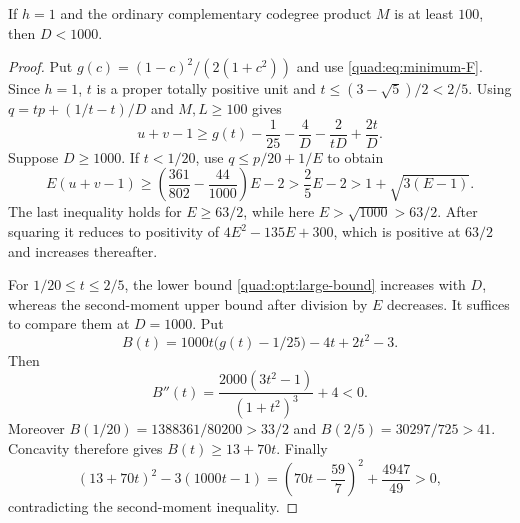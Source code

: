 \begin{lemma}\label{quad:opt:large-product}
If $h=1$ and the ordinary complementary codegree product $M$ is at
least $100$, then $D<1000$.
\end{lemma}
\begin{proof}
Put $g(c)=(1-c)^2/(2(1+c^2))$ and use
\eqref{quad:eq:minimum-F}. Since $h=1$, $t$ is a proper totally positive
unit and $t\le(3-\sqrt5)/2<2/5$. Using
$q=tp+(1/t-t)/D$ and $M,L\ge100$ gives
\begin{equation}\label{quad:opt:large-bound}
 u+v-1\ge g(t)-\frac1{25}-\frac4D-\frac2{tD}+\frac{2t}D.
\end{equation}
Suppose $D\ge1000$. If $t<1/20$, use $q\le p/20+1/E$ to obtain
\[
 E(u+v-1)\ge\left(\frac{361}{802}-\frac{44}{1000}\right)E-2
 >\frac25E-2>1+\sqrt{3(E-1)}.
\]
The last inequality holds for $E\ge63/2$, while here
$E>\sqrt{1000}>63/2$. After squaring it reduces to positivity of
$4E^2-135E+300$, which is positive at $63/2$ and increases thereafter.

For $1/20\le t\le2/5$, the lower bound
\eqref{quad:opt:large-bound} increases with $D$, whereas the
second-moment upper bound after division by $E$ decreases. It suffices
to compare them at $D=1000$. Put
\[
 B(t)=1000t\bigl(g(t)-1/25\bigr)-4t+2t^2-3.
\]
Then
\[
 B''(t)=\frac{2000(3t^2-1)}{(1+t^2)^3}+4<0.
\]
Moreover $B(1/20)=1388361/80200>33/2$ and
$B(2/5)=30297/725>41$. Concavity therefore gives
$B(t)\ge13+70t$. Finally
\[
 (13+70t)^2-3(1000t-1)
 =\left(70t-\frac{59}{7}\right)^2+\frac{4947}{49}>0,
\]
contradicting the second-moment inequality.
\end{proof}


